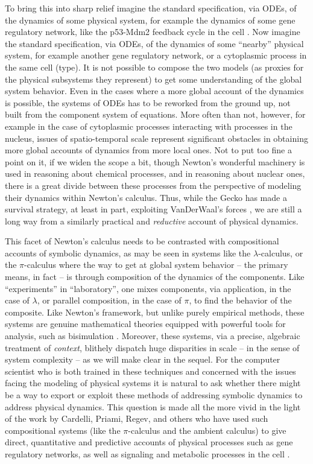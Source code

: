 To bring this into sharp relief imagine the standard specification,
via ODEs, of the dynamics of some physical system, for example the
dynamics of some gene regulatory network, like the p53-Mdm2 feedback
cycle in the cell \cite{Lahav2004}. Now imagine the standard
specification, via ODEs, of the dynamics of some ``nearby'' physical
system, for example another gene regulatory network, or a cytoplasmic
process in the same cell (type). It is not possible to compose the two
models (as proxies for the physical subsystems they represent) to get
some understanding of the global system behavior. Even in the cases
where a more global account of the dynamics is possible, the systems
of ODEs has to be reworked from the ground up, not built from the
component system of equations. More often than not, however, for
example in the case of cytoplasmic processes interacting with
processes in the nucleus, issues of spatio-temporal scale represent
significant obstacles in obtaining more global accounts of dynamics
from more local ones. Not to put too fine a point on it, if we widen
the scope a bit, though Newton's wonderful machinery is used in
reasoning about chemical processes, and in reasoning about nuclear
ones, there is a great divide between these processes from the
perspective of modeling their dynamics within Newton's calculus. Thus,
while the Gecko has made a survival strategy, at least in part,
exploiting VanDerWaal's forces \cite{Gecko}, we are still a long way
from a similarly practical and \emph{reductive} account of physical
dynamics.

This facet of Newton's calculus needs to be contrasted with
compositional accounts of symbolic dynamics, as may be seen in systems
like the $\lambda$-calculus, or the $\pi$-calculus where the way to
get at global system behavior -- the primary means, in fact -- is
through composition of the dynamics of the components. Like
``experiments'' in ``laboratory'', one mixes components, via
application, in the case of $\lambda$, or parallel composition, in the
case of $\pi$, to find the behavior of the composite. Like Newton's
framework, but unlike purely empirical methods, these systems are
genuine mathematical theories equipped with powerful tools for
analysis, such as bisimulation
\cite{DBLP:conf/lics/Sangiorgi04}. Moreover, these systems, via a
precise, algebraic treatment of \emph{context}, blithely dispatch huge
disparities in scale -- in the sense of system complexity -- as we
will make clear in the sequel. For the computer scientist who is both
trained in these techniques and concerned with the issues facing the
modeling of physical systems it is natural to ask whether there might
be a way to export or exploit these methods of addressing symbolic
dynamics to address physical dynamics. This question is made all the
more vivid in the light of the work by Cardelli, Priami, Regev, and
others who have used such compositional systems (like the
$\pi$-calculus and the ambient calculus) to give direct, quantitative
and predictive accounts of physical processes such as gene regulatory
networks, as well as signaling and metabolic processes in the
cell \cite{Cardelli04} \cite{DanosL03} \cite{RegevS03}
\cite{PriamiRSS01}.

